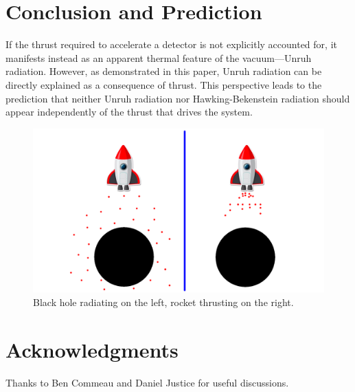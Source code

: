 \documentclass[12pt,a4paper]{article}
\begin{document}
\section{Conclusion and Prediction}
If the thrust required to accelerate a detector is not explicitly accounted for, it manifests instead as an apparent thermal feature of the vacuum—Unruh radiation. However, as demonstrated in this paper, Unruh radiation can be directly explained as a consequence of thrust. This perspective leads to the prediction that neither Unruh radiation nor Hawking-Bekenstein radiation should appear independently of the thrust that drives the system.

\begin{figure}[h]
\centering
\includegraphics[scale=0.5]{rocket.png}
\caption{Black hole radiating on the left, rocket thrusting on the right.}
\label{rocket}
\end{figure}

\section{Acknowledgments}
Thanks to Ben Commeau and Daniel Justice for useful discussions.



\end{document}
